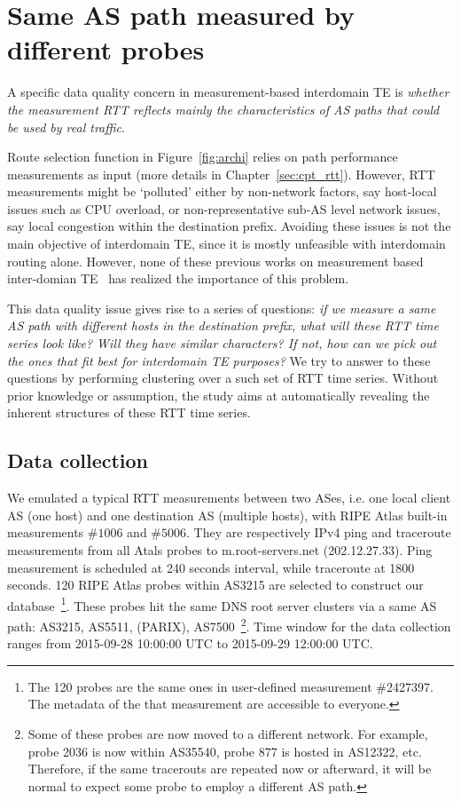 \section{Same AS path measured by different probes}
A specific data quality concern in measurement-based interdomain TE is \textit{whether the measurement RTT reflects mainly the characteristics of AS paths that could be used by real traffic}.

Route selection function in Figure~\ref{fig:archi} relies on path performance measurements as input (more details in Chapter~\ref{sec:cpt_rtt}).
However, RTT measurements might be `polluted' either by non-network factors, say host-local issues such as CPU overload, or non-representative sub-AS level network issues, say local congestion within the destination prefix.
Avoiding these issues is not the main objective of interdomain TE, since it is mostly unfeasible with interdomain routing alone.
However, none of these previous works on measurement based inter-domian TE~\cite{Goldenberg2004, Akella2008} has realized the importance of this problem.

This data quality issue gives rise to a series of questions: \textit{if we measure a same AS path with different hosts in the destination prefix, what will these RTT time series look like? Will they have similar characters? If not, how can we pick out the ones that fit best for interdomain TE purposes?}
We try to answer to these questions by performing clustering over a such set of RTT time series.
Without prior knowledge or assumption, the study aims at automatically revealing the inherent structures of these RTT time series.

\subsection{Data collection}
We emulated a typical RTT measurements between two ASes, i.e. one local client AS (one host) and one destination AS (multiple hosts), with RIPE Atlas built-in measurements $\#1006$ and $\#5006$.
They are respectively IPv4 ping and traceroute measurements from all Atals probes to m.root-servers.net (202.12.27.33). 
Ping measurement is scheduled at 240 seconds interval, while traceroute at 1800 seconds.
120 RIPE Atlas probes within AS3215 are selected to construct our database~\footnote{The 120 probes are the same ones in user-defined measurement \#2427397. The metadata of the that measurement are accessible to everyone.}.
These probes hit the same DNS root server clusters via a same AS path: AS3215, AS5511, (PARIX), AS7500~\footnote{Some of these probes are now moved to a different network. For example, probe 2036 is now within AS35540, probe 877 is hosted in AS12322, etc. Therefore, if the same tracerouts are repeated now or afterward, it will be normal to expect some probe to employ a different AS path.}. 
Time window for the data collection ranges from 2015-09-28 10:00:00 UTC to 2015-09-29 12:00:00 UTC.

